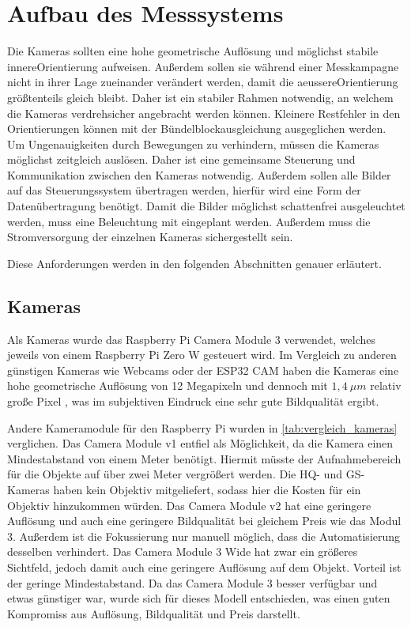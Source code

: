 \documentclass[./00PhotoBox.tex]{subfiles}
\begin{document}
\chapter{Aufbau des Messsystems}
Die Kameras sollten eine hohe geometrische Auflösung und möglichst stabile \gls{innereOrientierung} aufweisen. Außerdem sollen sie während einer Messkampagne nicht in ihrer Lage zueinander verändert werden, damit die \gls{aeussereOrientierung} größtenteils gleich bleibt. Daher ist ein stabiler Rahmen notwendig, an welchem die Kameras verdrehsicher angebracht werden können. Kleinere Restfehler in den Orientierungen können mit der Bündelblockausgleichung ausgeglichen werden.
Um Ungenauigkeiten durch Bewegungen zu verhindern, müssen die Kameras möglichst zeitgleich auslösen. Daher ist eine gemeinsame Steuerung und Kommunikation zwischen den Kameras notwendig. Außerdem sollen alle Bilder auf das Steuerungssystem übertragen werden, hierfür wird eine Form der Datenübertragung benötigt. Damit die Bilder möglichst schattenfrei ausgeleuchtet werden, muss eine Beleuchtung mit eingeplant werden. Außerdem muss die Stromversorgung der einzelnen Kameras sichergestellt sein.

Diese Anforderungen werden in den folgenden Abschnitten genauer erläutert.

\section{Kameras}
\label{s:kameras}
Als Kameras wurde das Raspberry Pi Camera Module 3 verwendet, welches jeweils von einem Raspberry Pi Zero W gesteuert wird. Im Vergleich zu anderen günstigen Kameras wie Webcams oder der ESP32 CAM haben die Kameras eine hohe geometrische Auflösung von 12 Megapixeln und dennoch mit $1,4~\mu m$ relativ große Pixel \citep{raspicamdatasheet}, was im subjektiven Eindruck eine sehr gute Bildqualität ergibt.

Andere Kameramodule für den Raspberry Pi wurden in \autoref{tab:vergleich_kameras} verglichen. Das Camera Module v1 entfiel als Möglichkeit, da die Kamera einen Mindestabstand von einem Meter benötigt. Hiermit müsste der Aufnahmebereich für die Objekte auf über zwei Meter vergrößert werden. Die HQ- und GS-Kameras haben kein Objektiv mitgeliefert, sodass hier die Kosten für ein Objektiv hinzukommen würden. Das Camera Module v2 hat eine geringere Auflösung und auch eine geringere Bildqualität bei gleichem Preis wie das Modul 3. Außerdem ist die Fokussierung nur manuell möglich, dass die Automatisierung desselben verhindert. Das Camera Module 3 Wide hat zwar ein größeres Sichtfeld, jedoch damit auch eine geringere Auflösung auf dem Objekt. Vorteil ist der geringe Mindestabstand. Da das Camera Module 3 besser verfügbar und etwas günstiger war, wurde sich für dieses Modell entschieden, was einen guten Kompromiss aus Auflösung, Bildqualität und Preis darstellt.
\end{document}
